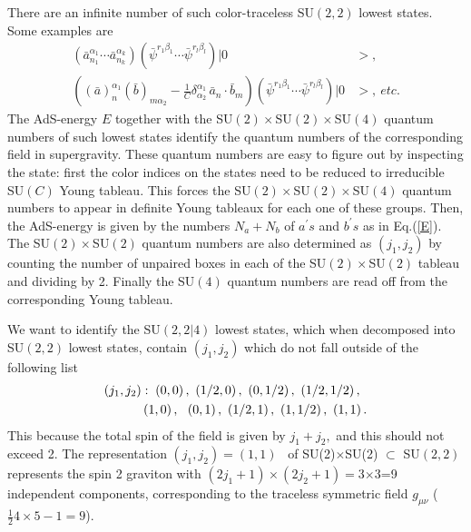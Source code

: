 \documentclass[a4paper,aps,preprint,nofootinbib]{revtex4}
\begin{document}
There are an infinite number of such color-traceless SU$\left( 2,2\right) $
lowest states. Some examples are
\begin{align}
\left( \bar{a}_{n_{1}}^{\alpha_{1}}\cdots\bar{a}_{n_{k}}^{\alpha_{k}}\right)
\left( \bar{\psi}^{r_{1}\beta_{1}}\cdots\bar{\psi}^{r_{l}\beta_{l}}\right)
|0 & >,\quad  \label{lwsu22} \\
\left( \left( \bar{a}\right) _{n}^{\alpha_{1}}\left( \bar{b}\right)
_{m\alpha_{2}}-\frac{1}{C}\delta_{\alpha_{2}}^{\alpha_{1}}\,\bar{a}_{n}\cdot
\bar{b}_{m}\right) \left( \bar{\psi}^{r_{1}\beta_{1}}\cdots\bar{\psi }%
^{r_{l}\beta_{l}}\right) |0 & >,~etc.
\end{align}
The AdS-energy $E$ together with the SU$\left( 2\right) \times$SU$\left(
2\right) \times$SU$\left( 4\right) $ quantum numbers of such lowest states
identify the quantum numbers of the corresponding field in supergravity.
These quantum numbers are easy to figure out by inspecting the state: first
the color indices on the states need to be reduced to irreducible SU$\left(
C\right) $ Young tableau. This forces the SU$\left( 2\right) \times $SU$%
\left( 2\right) \times$SU$\left( 4\right) $ quantum numbers to appear in
definite Young tableaux for each one of these groups. Then, the AdS-energy
is given by the numbers $N_{a}+N_{b}$ of $a^{\prime}s$ and $b^{\prime}s$ as
in Eq.(\ref{E}). The SU$\left( 2\right) \times$SU$\left( 2\right) $ quantum
numbers are also determined as $\left( j_{1},j_{2}\right) $ by counting the
number of unpaired boxes in each of the SU$\left( 2\right) \times$SU$\left(
2\right) $ tableau and dividing by 2. Finally the SU$\left( 4\right) $
quantum numbers are read off from the corresponding Young tableau.

We want to identify the SU$\left( 2,2|4\right) $ lowest states, which when
decomposed into SU$\left( 2,2\right) $ lowest states, contain $\left(
j_{1},j_{2}\right) $ which do not fall outside of the following list%
\begin{align}
\left( j_{1},j_{2}\right) & :\;\left( 0,0\right) ,~\left( 1/2,0\right)
,~\left( 0,1/2\right) ,~\left( 1/2,1/2\right) ,~  \label{j1j2} \\
& \left( 1,0\right) ,~~\left( 0,1\right) ,~\left( 1/2,1\right) ,~\left(
1,1/2\right) ,~\left( 1,1\right) .  \notag
\end{align}
This because the total spin of the field is given by $j_{1}+j_{2},$ and this
should not exceed 2. The representation $\left( j_{1},j_{2}\right) =\left(
1,1\right) $ \ of SU(2)$\times$SU(2) $\subset$ SU$\left( 2,2\right) $
represents the spin 2 graviton with $\left( 2j_{1}+1\right) \times\left(
2j_{2}+1\right) =$3$\times$3=9 independent components, corresponding to the
traceless symmetric field $g_{\mu\nu}$ ($\frac{1}{2}4\times5-1=9$).
\end{document}
